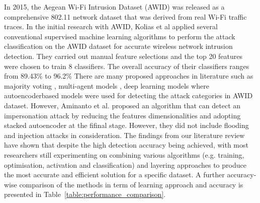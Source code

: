 \documentclass[letterpaper, 10pt, conference]{ieeeconf} %
\newcommand{\tab}[1]{Table~\ref{#1}}
\begin{document}
In 2015, the Aegean Wi-Fi Intrusion Dataset
(AWID) \cite{AWID} was released as a comprehensive 802.11 network dataset that was derived from real Wi-Fi traffic traces. In the initial research with AWID, Kolias et al \cite{AWID_main}  applied several conventional supervised machine learning algorithms to perform the attack classification on the AWID dataset for accurate wireless network intrusion detection. They carried out manual feature selections and the top 20 features were chosen to train 8 classifiers. The overall accuracy of their classifiers ranges from 89.43\% to 96.2\%
 There are many proposed approaches in literature such as majority voting \cite{alotaibi2016majority}, multi-agent models \cite{kaleem2016cognitive}, deep learning models \cite{aminanto2018deep,abdulhammed2018machine}  where autoencoderbased models were used for detecting the attack categories in AWID dataset. However, Aminanto et al. \cite{aminanto2018deep} proposed an algorithm that can detect an impersonation attack by reducing the features dimensionalities and adopting stacked autoencoder at the fiﬁnal stage. However, they did not include flooding and injection attacks in consideration. 
The findings from our literature review have shown that despite the high detection accuracy being achieved, with most researchers still experimenting on combining various algorithms (e.g. training, optimisation, activation and classification) and layering approaches to produce the most accurate and efficient solution for a specific dataset. A further accuracy-wise comparison of the methods in term of learning approach and accuracy is presented in \tab{table:performance_comparison}.
\end{document}
